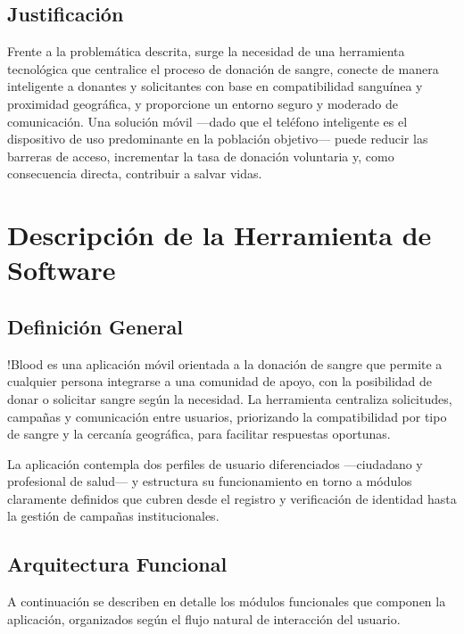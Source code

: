 \documentclass[12pt, a4paper]{article}
\begin{document}
\subsection{Justificación}

Frente a la problemática descrita, surge la necesidad de una herramienta tecnológica que centralice el proceso de donación de sangre, conecte de manera inteligente a donantes y solicitantes con base en compatibilidad sanguínea y proximidad geográfica, y proporcione un entorno seguro y moderado de comunicación. Una solución móvil ---dado que el teléfono inteligente es el dispositivo de uso predominante en la población objetivo--- puede reducir las barreras de acceso, incrementar la tasa de donación voluntaria y, como consecuencia directa, contribuir a salvar vidas.

\section{Descripción de la Herramienta de Software}

\subsection{Definición General}

!Blood es una aplicación móvil orientada a la donación de sangre que permite a cualquier persona integrarse a una comunidad de apoyo, con la posibilidad de donar o solicitar sangre según la necesidad. La herramienta centraliza solicitudes, campañas y comunicación entre usuarios, priorizando la compatibilidad por tipo de sangre y la cercanía geográfica, para facilitar respuestas oportunas.

La aplicación contempla dos perfiles de usuario diferenciados ---ciudadano y profesional de salud--- y estructura su funcionamiento en torno a módulos claramente definidos que cubren desde el registro y verificación de identidad hasta la gestión de campañas institucionales.

\subsection{Arquitectura Funcional}

A continuación se describen en detalle los módulos funcionales que componen la aplicación, organizados según el flujo natural de interacción del usuario.
\end{document}
